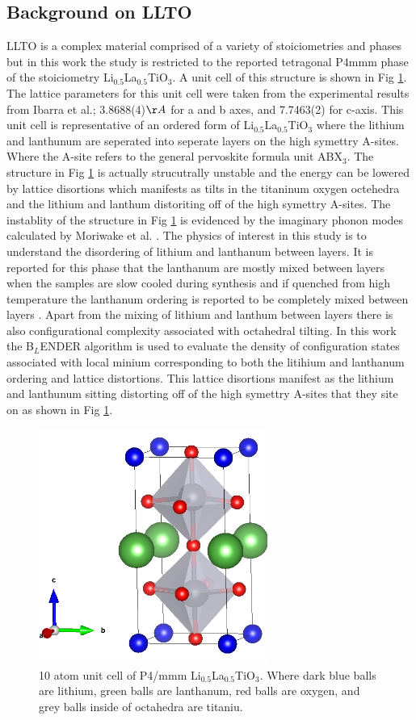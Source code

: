 \documentclass[aps,prl,reprint,superscriptaddress,showkeys]{revtex4-1}
\begin{document}
\subsection{Background on LLTO}
LLTO is a complex material comprised of a variety of stoiciometries and phases but in this work the study is restricted to the reported tetragonal P4mmm phase of the stoiciometry Li$_{0.5}$La$_{0.5}$TiO$_{3}$\cite{LLTOreview,P4mmmstrucuture}. A unit cell of this structure is shown in Fig \ref{LLTO_unit_cell}. The lattice parameters for this unit cell were taken from the experimental results from Ibarra et al.\cite{P4mmmstrucuture}; 3.8688(4)$\AA$ for a and b axes, and 7.7463(2) for c-axis.  This unit cell is representative of an ordered form of Li$_{0.5}$La$_{0.5}$TiO$_{3}$ where the lithium and lanthunum are seperated into seperate layers on the high symettry A-sites. Where the A-site refers to the general pervoskite formula unit ABX$_3$.  The structure in Fig \ref{LLTO_unit_cell} is actually strucutrally unstable and the energy can be lowered by lattice disortions which manifests as tilts in the titaninum oxygen octehedra and the lithium and lanthum distoriting off of the high symettry A-sites. The instablity of the structure in Fig \ref{LLTO_unit_cell} is evidenced by the imaginary phonon modes calculated by Moriwake et al. \cite{imaginary_phonons}.  The physics of interest in this study is to understand the disordering of lithium and lanthanum between layers.  It is reported for this phase that the lanthanum are mostly mixed between layers when the samples are slow cooled during synthesis and if quenched from high temperature the lanthanum ordering is reported to be completely mixed between layers \cite{P4mmmstrucuture}. Apart from the mixing of lithium and lanthum between layers there is also configurational complexity associated with octahedral tilting. In this work the B$_L$ENDER algorithm is used to evaluate the density of configuration states associated with local minium corresponding to both the litihium and lanthanum ordering and lattice distortions.  This lattice disortions manifest as the lithium and lanthunum sitting distorting off of the high symettry A-sites that they site on as shown in Fig \ref{LLTO_unit_cell}. 
\begin{figure}
\includegraphics[width=7.5cm]{./figures/unit_cell_P4mmm_cropped.png}
\caption{10 atom unit cell of P4/mmm Li$_{0.5}$La$_{0.5}$TiO$_{3}$. Where dark blue balls are lithium, green balls are lanthanum, red balls are oxygen, and grey balls inside of octahedra are titaniu.\label{LLTO_unit_cell}}
\end{figure}
\end{document}
